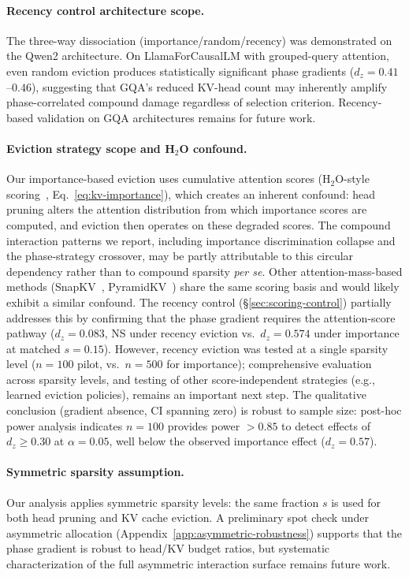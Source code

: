 \paragraph{Recency control architecture scope.}
The three-way dissociation (importance/random/recency) was demonstrated on the Qwen2 architecture. On LlamaForCausalLM with grouped-query attention, even random eviction produces statistically significant phase gradients ($d_z{=}0.41$--$0.46$), suggesting that GQA's reduced KV-head count may inherently amplify phase-correlated compound damage regardless of selection criterion. Recency-based validation on GQA architectures remains for future work.

\paragraph{Eviction strategy scope and H$_2$O confound.}
Our importance-based eviction uses cumulative attention scores (H$_2$O-style scoring~\cite{h2o-neurips2023}, Eq.~\ref{eq:kv-importance}), which creates an inherent confound: head pruning alters the attention distribution from which importance scores are computed, and eviction then operates on these degraded scores. The compound interaction patterns we report, including importance discrimination collapse and the phase-strategy crossover, may be partly attributable to this circular dependency rather than to compound sparsity \emph{per se}. Other attention-mass-based methods (SnapKV~\cite{snapkv-neurips2024}, PyramidKV~\cite{pyramidkv-colm2025}) share the same scoring basis and would likely exhibit a similar confound. The recency control (\S\ref{sec:scoring-control}) partially addresses this by confirming that the phase gradient requires the attention-score pathway ($d_z{=}0.083$, NS under recency eviction vs.\ $d_z{=}0.574$ under importance at matched $s{=}0.15$). However, recency eviction was tested at a single sparsity level ($n{=}100$ pilot, vs.\ $n{=}500$ for importance); comprehensive evaluation across sparsity levels, and testing of other score-independent strategies (e.g., learned eviction policies), remains an important next step. The qualitative conclusion (gradient absence, CI spanning zero) is robust to sample size: post-hoc power analysis indicates $n{=}100$ provides power $> 0.85$ to detect effects of $d_z \geq 0.30$ at $\alpha{=}0.05$, well below the observed importance effect ($d_z{=}0.57$).

\paragraph{Symmetric sparsity assumption.}
Our analysis applies symmetric sparsity levels: the same fraction $s$ is used for both head pruning and KV cache eviction. A preliminary spot check under asymmetric allocation (Appendix~\ref{app:asymmetric-robustness}) supports that the phase gradient is robust to head/KV budget ratios, but systematic characterization of the full asymmetric interaction surface remains future work.

